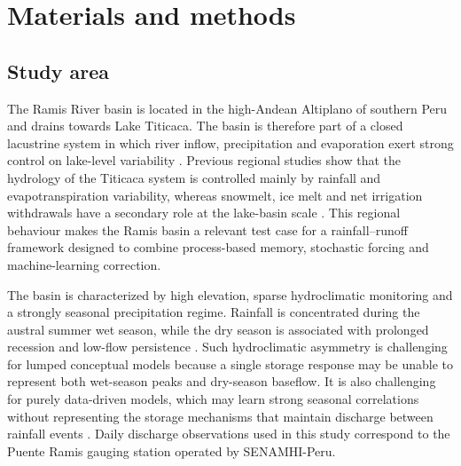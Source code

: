 \documentclass[a4paper,fleqn]{cas-sc}
\begin{document}
\section{Materials and methods}\label{sec:methods}

\subsection{Study area}\label{subsec:study-area}

The Ramis River basin is located in the high-Andean Altiplano of
southern Peru and drains towards Lake Titicaca. The basin is therefore
part of a closed lacustrine system in which river inflow, precipitation
and evaporation exert strong control on lake-level variability
\citep{cross2001late,condom2004transient,lima2025modeling}. Previous
regional studies show that the hydrology of the Titicaca system is
controlled mainly by rainfall and evapotranspiration variability,
whereas snowmelt, ice melt and net irrigation withdrawals have a
secondary role at the lake-basin scale \citep{lima2025modeling}. This
regional behaviour makes the Ramis basin a relevant test case for a
rainfall--runoff framework designed to combine process-based memory,
stochastic forcing and machine-learning correction.

The basin is characterized by high elevation, sparse hydroclimatic
monitoring and a strongly seasonal precipitation regime. Rainfall is
concentrated during the austral summer wet season, while the dry season
is associated with prolonged recession and low-flow persistence
\citep{condom2004transient,nauditt2017conceptual,lima2025modeling}.
Such hydroclimatic asymmetry is challenging for lumped conceptual
models because a single storage response may be unable to represent both
wet-season peaks and dry-season baseflow. It is also challenging for
purely data-driven models, which may learn strong seasonal correlations
without representing the storage mechanisms that maintain discharge
between rainfall events \citep{van2013influence,lees2021benchmarking}.
Daily discharge observations used in this study correspond to the
Puente Ramis gauging station operated by SENAMHI-Peru.

\end{document}
